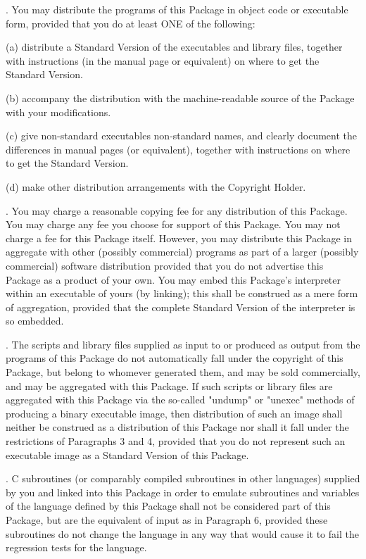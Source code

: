 \documentclass[10pt,letterpaper]{report}
\newenvironment{lquote}{\begin{list}{}{}\item[]}{\end{list}}
\begin{document}
. You may distribute the programs of this Package in object code or executable form, provided that you do at least ONE of the following:

\begin{lquote}
(a) distribute a Standard Version of the executables and library files, together with instructions (in the manual page or equivalent) on where to get the Standard Version.

(b) accompany the distribution with the machine-readable source of the Package with your modifications.

(c) give non-standard executables non-standard names, and clearly document the differences in manual pages (or equivalent), together with instructions on where to get the Standard Version.

(d) make other distribution arrangements with the Copyright Holder.
\end{lquote}

. You may charge a reasonable copying fee for any distribution of this Package.  You may charge any fee you choose for support of this Package.  You may not charge a fee for this Package itself.  However, you may distribute this Package in aggregate with other (possibly commercial) programs as part of a larger (possibly commercial) software distribution provided that you do not advertise this Package as a product of your own.  You may embed this Package's interpreter within an executable of yours (by linking); this shall be construed as a mere form of aggregation, provided that the complete Standard Version of the interpreter is so embedded.
\vspace{8pt}

. The scripts and library files supplied as input to or produced as output from the programs of this Package do not automatically fall under the copyright of this Package, but belong to whomever generated them, and may be sold commercially, and may be aggregated with this Package.  If such scripts or library files are aggregated with this Package via the so-called "undump" or "unexec" methods of producing a binary executable image, then distribution of such an image shall neither be construed as a distribution of this Package nor shall it fall under the restrictions of Paragraphs 3 and 4, provided that you do not represent such an executable image as a Standard Version of this Package.
\vspace{8pt}

. C subroutines (or comparably compiled subroutines in other languages) supplied by you and linked into this Package in order to emulate subroutines and variables of the language defined by this Package shall not be considered part of this Package, but are the equivalent of input as in Paragraph 6, provided these subroutines do not change the language in any way that would cause it to fail the regression tests for the language.
\vspace{8pt}
\end{document}
